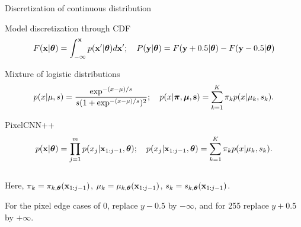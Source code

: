 \begin{frame}{Discretization of continuous distribution}
	\vspace{-0.3cm}
	\begin{block}{Model discretization through CDF}
		\vspace{-0.6cm}
		\[
			F(\mathbf{x} | \boldsymbol{\theta}) = \int_{-\infty}^{\mathbf{x}} p(\mathbf{x}' | \boldsymbol{\theta}) d\mathbf{x}'; \quad 
			P(\mathbf{y} | \boldsymbol{\theta}) = F(\mathbf{y} + 0.5 | \boldsymbol{\theta}) - F(\mathbf{y} - 0.5 | \boldsymbol{\theta})
		\]
	\end{block}
	\vspace{-0.6cm}
	\begin{block}{Mixture of logistic distributions}
		\vspace{-0.7cm}
		\[
			p(x | \mu, s) = \frac{\exp^{-(x - \mu) / s}}{s (1 + \exp^{-(x - \mu) / s})^2}; \quad p(x | \boldsymbol{\pi}, \boldsymbol{\mu}, \mathbf{s}) = \sum_{k=1}^K \pi_k p(x | \mu_k, s_k).
		\]
		\vspace{-0.7cm}
	\end{block}
	\begin{block}{PixelCNN++}
		\vspace{-0.7cm}
		\[
			p(\mathbf{x} | \boldsymbol{\theta}) = \prod_{j=1}^m p(x_j | \mathbf{x}_{1:j-1}, \boldsymbol{\theta}); \quad p(x_j | \mathbf{x}_{1:j-1}, \boldsymbol{\theta}) = \sum_{k=1}^K \pi_k p(x | \mu_k, s_k).
		\]
		\vspace{-0.5cm} \\
		Here, $\pi_k = \pi_{k, \boldsymbol{\theta}}(\mathbf{x}_{1:j-1})$, $\mu_k = \mu_{k, \boldsymbol{\theta}}(\mathbf{x}_{1:j-1})$, $s_k = s_{k, \boldsymbol{\theta}}(\mathbf{x}_{1:j-1})$.
	\end{block}

	For the pixel edge cases of 0, replace $y - 0.5$ by $-\infty$, and for 255 replace $y + 0.5$ by $+\infty$.
	\end{frame}
